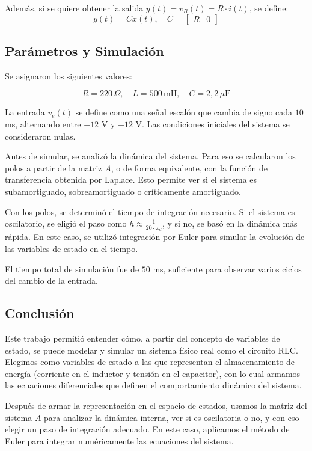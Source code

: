 \documentclass{article}
\begin{document}
Además, si se quiere obtener la salida $y(t) = v_R(t) = R \cdot i(t)$, se define:
\[
y(t) = C x(t), \quad
C = 
\begin{bmatrix}
R & 0
\end{bmatrix}
\]

\subsection*{Parámetros y Simulación}

Se asignaron los siguientes valores:

\[
R = 220 \, \Omega, \quad L = 500 \, \text{mH}, \quad C = 2{,}2 \, \mu\text{F}
\]

La entrada $v_e(t)$ se define como una señal escalón que cambia de signo cada $10$ ms, alternando entre $+12$ V y $-12$ V. Las condiciones iniciales del sistema se consideraron nulas.

Antes de simular, se analizó la dinámica del sistema. Para eso se calcularon los polos a partir de la matriz $A$, o de forma equivalente, con la función de transferencia obtenida por Laplace. Esto permite ver si el sistema es subamortiguado, sobreamortiguado o críticamente amortiguado.

Con los polos, se determinó el tiempo de integración necesario. Si el sistema es oscilatorio, se eligió el paso como $h \approx \frac{1}{20 \cdot \omega_d}$, y si no, se basó en la dinámica más rápida. En este caso, se utilizó integración por Euler para simular la evolución de las variables de estado en el tiempo.

El tiempo total de simulación fue de $50$ ms, suficiente para observar varios ciclos del cambio de la entrada.

\subsection*{Conclusión}

Este trabajo permitió entender cómo, a partir del concepto de variables de estado, se puede modelar y simular un sistema físico real como el circuito RLC. Elegimos como variables de estado a las que representan el almacenamiento de energía (corriente en el inductor y tensión en el capacitor), con lo cual armamos las ecuaciones diferenciales que definen el comportamiento dinámico del sistema.

Después de armar la representación en el espacio de estados, usamos la matriz del sistema $A$ para analizar la dinámica interna, ver si es oscilatoria o no, y con eso elegir un paso de integración adecuado. En este caso, aplicamos el método de Euler para integrar numéricamente las ecuaciones del sistema.
\end{document}
